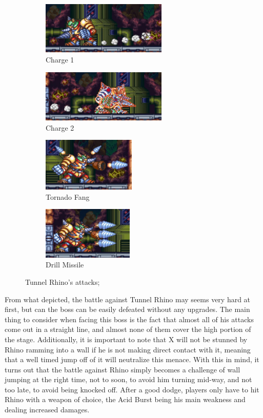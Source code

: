 \begin{figure}[htp]
	\centering
	\begin{subfigure}{\linewidth}
		\centering
		\includegraphics[height=2.5cm]{figures/X3/Tunnel_rhino/rhyno_dash.jpg}
		\caption{Charge 1}
	\end{subfigure}
	\begin{subfigure}{\linewidth}
		\centering
		\includegraphics[height=2.5cm]{figures/X3/Tunnel_rhino/rhyno_dm.jpg}
		\caption{Charge 2}
	\end{subfigure}

	\begin{subfigure}{.4\linewidth}
		\centering
		\includegraphics[height=2.56cm]{figures/X3/Tunnel_rhino/rhyno_tri.jpg}
		\caption{Tornado Fang}
	\end{subfigure}
	\begin{subfigure}{.4\linewidth}
		\centering
		\includegraphics[height=2.5cm]{figures/X3/Tunnel_rhino/rhyno_fang.jpg}
		\caption{Drill Missile}
	\end{subfigure}
	\caption{Tunnel Rhino's attacks;}
\end{figure}

From what depicted, the battle against Tunnel Rhino may seems very hard at first, but can the boss can be easily defeated without any upgrades. The main thing to consider when facing this boss is the fact that almost all of his attacks come out in a straight line, and almost none of them cover the high portion of the stage. Additionally, it is important to note that X will not be stunned by Rhino ramming into a wall if he is not making direct contact with it, meaning that a well timed jump off of it will neutralize this menace. With this in mind, it turns out that the battle against Rhino simply becomes a challenge of wall jumping at the right time, not to soon, to avoid him turning mid-way, and not too late, to avoid being knocked off. After a good dodge, players only have to hit Rhino with a weapon of choice, the Acid Burst being his main weakness and dealing increased damages. 

